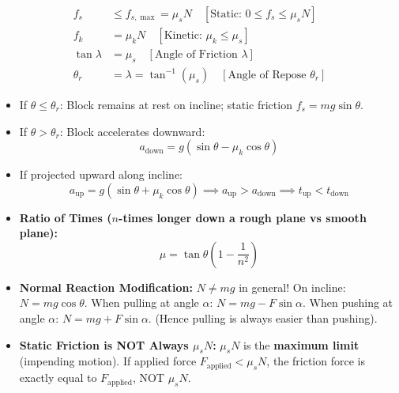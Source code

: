 \documentclass[10pt,twoside,openright]{book}
\begin{document}
\begin{formulabox}
\begin{align}
  f_s &\le f_{s,\max} = \mu_s N \quad [\text{Static: } 0 \le f_s \le \mu_s N] \\
  f_k &= \mu_k N \quad [\text{Kinetic: } \mu_k \le \mu_s] \\
  \tan\lambda &= \mu_s \quad [\text{Angle of Friction } \lambda] \\
  \theta_r &= \lambda = \tan^{-1}(\mu_s) \quad [\text{Angle of Repose } \theta_r]
\end{align}
\end{formulabox}

\begin{usecasebox}
\begin{itemize}
  \item If $\theta \le \theta_r$: Block remains at rest on incline; static friction $f_s = mg\sin\theta$.
  \item If $\theta > \theta_r$: Block accelerates downward:
  \begin{equation*}
    a_{\text{down}} = g(\sin\theta - \mu_k\cos\theta)
  \end{equation*}
  \item If projected upward along incline:
  \begin{equation*}
    a_{\text{up}} = g(\sin\theta + \mu_k\cos\theta) \implies a_{\text{up}} > a_{\text{down}} \implies t_{\text{up}} < t_{\text{down}}
  \end{equation*}
  \item \textbf{Ratio of Times ($n$-times longer down a rough plane vs smooth plane):}
  \begin{equation*}
    \mu = \tan\theta\left(1 - \frac{1}{n^2}\right)
  \end{equation*}
\end{itemize}
\end{usecasebox}

\begin{trapbox}
\begin{itemize}
  \item \textbf{Normal Reaction Modification:} $N \ne mg$ in general! On incline: $N = mg\cos\theta$. When pulling at angle $\alpha$: $N = mg - F\sin\alpha$. When pushing at angle $\alpha$: $N = mg + F\sin\alpha$. (Hence pulling is always easier than pushing).
  \item \textbf{Static Friction is NOT Always $\mu_s N$:} $\mu_s N$ is the \textbf{maximum limit} (impending motion). If applied force $F_{\text{applied}} < \mu_s N$, the friction force is exactly equal to $F_{\text{applied}}$, NOT $\mu_s N$.
\end{itemize}
\end{trapbox}
\end{document}
